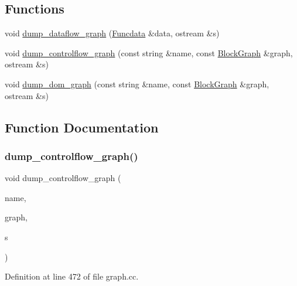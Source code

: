 \subsection*{Functions}
\begin{DoxyCompactItemize}
\item 
void \mbox{\hyperlink{graph_8hh_a914703798090e36fa19da547f0654100}{dump\+\_\+dataflow\+\_\+graph}} (\mbox{\hyperlink{class_funcdata}{Funcdata}} \&data, ostream \&s)
\item 
void \mbox{\hyperlink{graph_8hh_ae713b221a222f79d61f60e5331e216e5}{dump\+\_\+controlflow\+\_\+graph}} (const string \&name, const \mbox{\hyperlink{class_block_graph}{Block\+Graph}} \&graph, ostream \&s)
\item 
void \mbox{\hyperlink{graph_8hh_ab3b7b64dd44b81ae503239ecfaa66757}{dump\+\_\+dom\+\_\+graph}} (const string \&name, const \mbox{\hyperlink{class_block_graph}{Block\+Graph}} \&graph, ostream \&s)
\end{DoxyCompactItemize}


\subsection{Function Documentation}
\mbox{\label{graph_8hh_ae713b221a222f79d61f60e5331e216e5}} 
\subsubsection{\texorpdfstring{dump\_controlflow\_graph()}{dump\_controlflow\_graph()}}
{\footnotesize\ttfamily void dump\+\_\+controlflow\+\_\+graph (\begin{DoxyParamCaption}\item[{const string \&}]{name,  }\item[{const \mbox{\hyperlink{class_block_graph}{Block\+Graph}} \&}]{graph,  }\item[{ostream \&}]{s }\end{DoxyParamCaption})}



Definition at line 472 of file graph.\+cc.

\mbox{\label{graph_8hh_a914703798090e36fa19da547f0654100}} 

